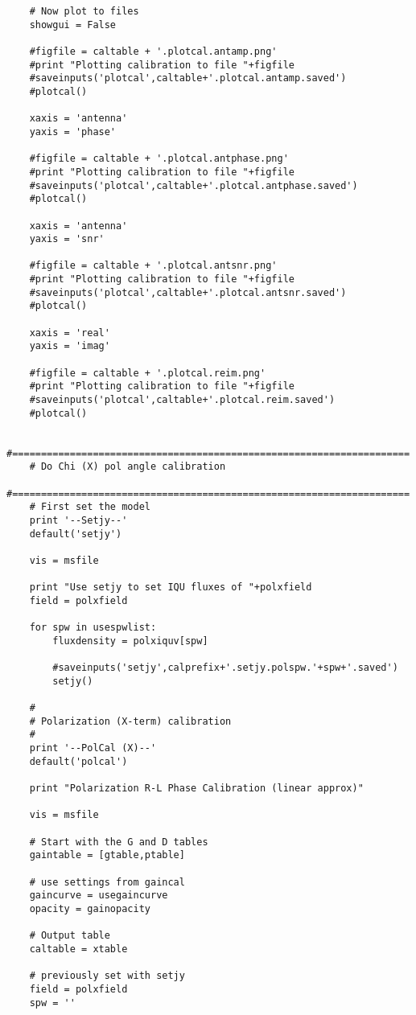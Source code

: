\begin{verbatim}
    # Now plot to files
    showgui = False

    #figfile = caltable + '.plotcal.antamp.png'
    #print "Plotting calibration to file "+figfile
    #saveinputs('plotcal',caltable+'.plotcal.antamp.saved')
    #plotcal()

    xaxis = 'antenna'
    yaxis = 'phase'

    #figfile = caltable + '.plotcal.antphase.png'
    #print "Plotting calibration to file "+figfile
    #saveinputs('plotcal',caltable+'.plotcal.antphase.saved')
    #plotcal()

    xaxis = 'antenna'
    yaxis = 'snr'

    #figfile = caltable + '.plotcal.antsnr.png'
    #print "Plotting calibration to file "+figfile
    #saveinputs('plotcal',caltable+'.plotcal.antsnr.saved')
    #plotcal()

    xaxis = 'real'
    yaxis = 'imag'

    #figfile = caltable + '.plotcal.reim.png'
    #print "Plotting calibration to file "+figfile
    #saveinputs('plotcal',caltable+'.plotcal.reim.saved')
    #plotcal()

    #=====================================================================
    # Do Chi (X) pol angle calibration
    #=====================================================================
    # First set the model
    print '--Setjy--'
    default('setjy')
        
    vis = msfile
        
    print "Use setjy to set IQU fluxes of "+polxfield
    field = polxfield
    
    for spw in usespwlist:
        fluxdensity = polxiquv[spw]
        
        #saveinputs('setjy',calprefix+'.setjy.polspw.'+spw+'.saved')
        setjy()
    
    #
    # Polarization (X-term) calibration
    #
    print '--PolCal (X)--'
    default('polcal')
    
    print "Polarization R-L Phase Calibration (linear approx)"
    
    vis = msfile
    
    # Start with the G and D tables
    gaintable = [gtable,ptable]
    
    # use settings from gaincal
    gaincurve = usegaincurve
    opacity = gainopacity
    
    # Output table
    caltable = xtable

    # previously set with setjy
    field = polxfield
    spw = ''
    

\end{verbatim}
